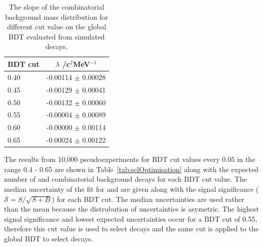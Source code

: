 {\begin{table}[htbp]
\begin{center}
\begin{tabular}{lc}
\hline
BDT cut & $\lambda$ /c$^{2}$MeV$^{-1}$\\ \hline
0.40 & -0.00114 $\pm$ 0.00028 \\
0.45 & -0.00129 $\pm$ 0.00041 \\
0.50 & -0.00132 $\pm$ 0.00060 \\
0.55 & -0.00004 $\pm$ 0.00089 \\
0.60 & -0.00000 $\pm$ 0.00114 \\
0.65 & -0.00024 $\pm$ 0.00122 \\ \hline
\end{tabular}
\vspace{0.7cm}
\caption{The slope of the combinatorial background mass distribution for different cut value on the global BDT evaluated from \bbbarmumux simulated decays.}
\label{tab:CBGSlopeBDT}
\end{center}
\vspace{-1.0cm}
\end{table}



The results from 10,000 pseudoexperiments for BDT cut values every 0.05 in the range 0.4 - 0.65 are shown in Table~\ref{tab:selOptimisation} along with the expected number of \bsmumu and combinatorial background decays for each BDT cut value. The median uncertainty of the fit for \tmumu and \invtmumu are given along with the signal significance ($\mathcal{S} = S/\sqrt{S+B}$) for each BDT cut. The median uncertainties are used rather than the mean because the distrubution of uncertainties is asymetric. The highest signal significance and lowest expected uncertainties occur for a BDT cut of 0.55, therefore this cut value is used to select \bsmumu decays and the same cut is applied to the global BDT to select \bhh decays. 


}
